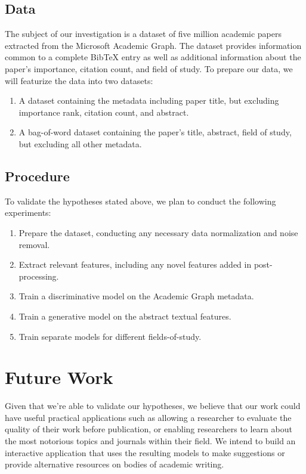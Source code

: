 \documentclass[12pt]{extarticle}
\begin{document}
\subsection*{Data}
The subject of our investigation is a dataset of five million academic papers extracted from the Microsoft Academic Graph. The dataset provides information common to a complete BibTeX entry as well as additional information about the paper’s importance, citation count, and field of study. To prepare our data, we will featurize the data into two datasets:
\begin{enumerate}
  \item A dataset containing the metadata including paper title, but excluding importance rank, citation count, and abstract.
  \item A bag-of-word dataset containing the paper’s title, abstract, field of study, but excluding all other metadata. 
\end{enumerate}

\subsection*{Procedure}
To validate the hypotheses stated above, we plan to conduct the following experiments:

\begin{enumerate}
  \item Prepare the dataset, conducting any necessary data normalization and noise removal.
  \item Extract relevant features, including any novel features added in post-processing.
  \item Train a discriminative model on the Academic Graph metadata. 
  \item Train a generative model on the abstract textual features.
  \item Train separate models for different fields-of-study.
\end{enumerate}

\section*{Future Work}
Given that we're able to validate our hypotheses, we believe that our work could have useful practical applications such as allowing a researcher to evaluate the quality of their work before publication, or enabling researchers to learn about the most notorious topics and journals within their field. We intend to build an interactive application that uses the resulting models to make suggestions or provide alternative resources on bodies of academic writing.




\end{document}
